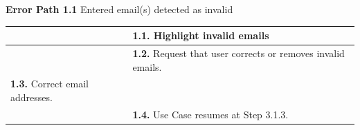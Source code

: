 \documentclass[letterpaper,12pt]{report}
\begin{document}
{\centering \textbf{Error Path 1.1}
\linebreak Entered email(s) detected as invalid
\begin{center}
\xuchead
\begin{tabular}{| p{8.5cm} | p{8.5cm} |}
\hline
& \textbf{1.1.} Highlight invalid emails \\
\hline
& \textbf{1.2.} Request that user corrects or removes invalid emails. \\
\hline
\textbf{1.3.} Correct email addresses. & \\
\hline
& \textbf{1.4.} Use Case\index{Use Case} resumes at Step 3.1.3. \\
\hline
\end{tabular}
\end{center}

}

\pagebreak
\end{document}
